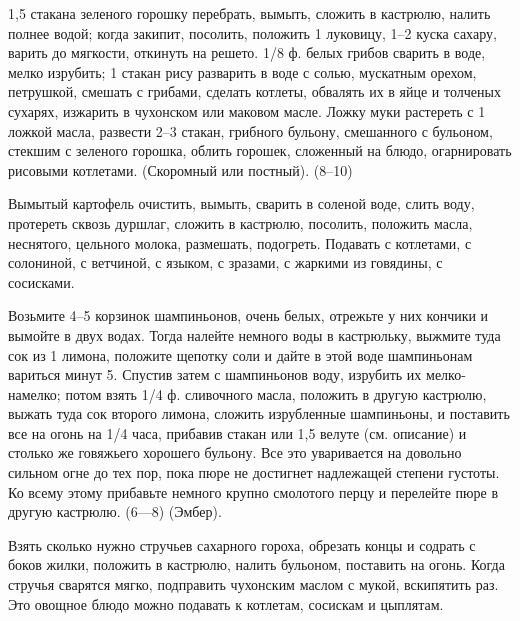 
1,5 стакана зеленого горошку перебрать, вымыть, сложить в кастрюлю, налить полнее водой; когда закипит, посолить, положить 1 луковицу, 1--2 куска сахару, варить до мягкости, откинуть на решето. 1/8 ф. белых грибов сварить в воде, мелко изрубить; 1 стакан рису разварить в воде с солью, мускатным орехом, петрушкой, смешать с грибами, сделать котлеты, обвалять их в яйце и толченых сухарях, изжарить в чухонском или маковом масле. Ложку муки растереть с 1 ложкой масла, развести 2--3 стакан, грибного бульону, смешанного с бульоном, стекшим с зеленого горошка, облить горошек, сложенный на блюдо, огарнировать рисовыми котлетами. (Скоромный или постный). (8--10) 


Вымытый картофель очистить, вымыть, сварить в соленой воде, слить воду, протереть сквозь дуршлаг, сложить в кастрюлю, посолить, положить масла, неснятого, цельного молока, размешать, подогреть. Подавать с котлетами, с солониной, с ветчиной, с языком, с зразами, с жаркими из говядины, с сосисками. 


Возьмите 4--5 корзинок шампиньонов, очень белых, отрежьте у них кончики и вымойте в двух водах. Тогда налейте немного воды в кастрюльку, выжмите туда сок из 1 лимона, положите щепотку соли и дайте в этой воде шампиньонам вариться минут 5. Спустив затем с шампиньонов воду, изрубить их мелко-намелко; потом взять 1/4 ф. сливочного масла, положить в другую кастрюлю, выжать туда сок второго лимона, сложить изрубленные шампиньоны, и поставить все на огонь на 1/4 часа, прибавив стакан или 1,5 велуте (см. описание) и столько же говяжьего хорошего бульону. Все это уваривается на довольно сильном огне до тех пор, пока пюре не достигнет надлежащей степени густоты. Ко всему этому прибавьте немного крупно смолотого перцу и перелейте пюре в другую кастрюлю. (6—8) (Эмбер). 


Взять сколько нужно стручьев сахарного гороха, обрезать концы и содрать с боков жилки, положить в кастрюлю, налить бульоном, поставить на огонь. Когда стручья сварятся мягко, подправить чухонским маслом с мукой, вскипятить раз. Это овощное блюдо можно подавать к котлетам, сосискам и цыплятам. 

